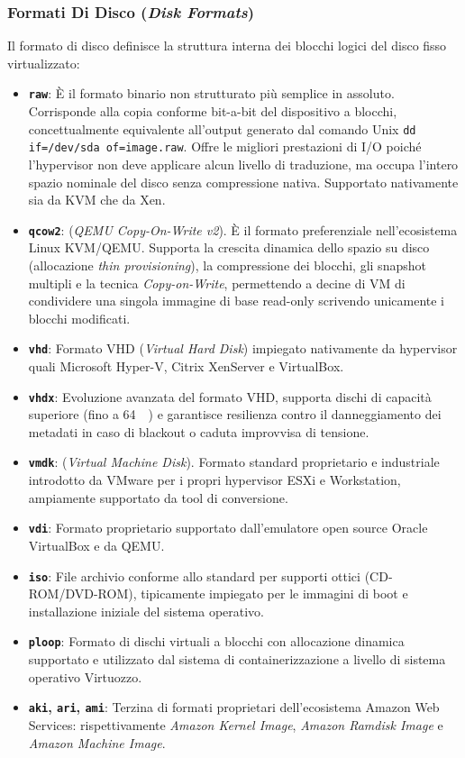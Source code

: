 \documentclass[11pt, a4paper]{article}
\begin{document}
\subsubsection{Formati Di Disco (\emph{Disk Formats})}
Il formato di disco definisce la struttura interna dei blocchi logici del disco fisso virtualizzato:
\begin{itemize}
    \item \textbf{\texttt{raw}}: È il formato binario non strutturato più semplice in assoluto. Corrisponde alla copia conforme bit-a-bit del dispositivo a blocchi, concettualmente equivalente all'output generato dal comando Unix \texttt{dd if=/dev/sda of=image.raw}. Offre le migliori prestazioni di I/O poiché l'hypervisor non deve applicare alcun livello di traduzione, ma occupa l'intero spazio nominale del disco senza compressione nativa. Supportato nativamente sia da KVM che da Xen.
    \item \textbf{\texttt{qcow2}}: (\emph{QEMU Copy-On-Write v2}). È il formato preferenziale nell'ecosistema Linux KVM/QEMU. Supporta la crescita dinamica dello spazio su disco (allocazione \emph{thin provisioning}), la compressione dei blocchi, gli snapshot multipli e la tecnica \emph{Copy-on-Write}, permettendo a decine di VM di condividere una singola immagine di base read-only scrivendo unicamente i blocchi modificati.
    \item \textbf{\texttt{vhd}}: Formato VHD (\emph{Virtual Hard Disk}) impiegato nativamente da hypervisor quali Microsoft Hyper-V, Citrix XenServer e VirtualBox.
    \item \textbf{\texttt{vhdx}}: Evoluzione avanzata del formato VHD, supporta dischi di capacità superiore (fino a \SI{64}{\tera\byte}) e garantisce resilienza contro il danneggiamento dei metadati in caso di blackout o caduta improvvisa di tensione.
    \item \textbf{\texttt{vmdk}}: (\emph{Virtual Machine Disk}). Formato standard proprietario e industriale introdotto da VMware per i propri hypervisor ESXi e Workstation, ampiamente supportato da tool di conversione.
    \item \textbf{\texttt{vdi}}: Formato proprietario supportato dall'emulatore open source Oracle VirtualBox e da QEMU.
    \item \textbf{\texttt{iso}}: File archivio conforme allo standard per supporti ottici (CD-ROM/DVD-ROM), tipicamente impiegato per le immagini di boot e installazione iniziale del sistema operativo.
    \item \textbf{\texttt{ploop}}: Formato di dischi virtuali a blocchi con allocazione dinamica supportato e utilizzato dal sistema di containerizzazione a livello di sistema operativo Virtuozzo.
    \item \textbf{\texttt{aki}, \texttt{ari}, \texttt{ami}}: Terzina di formati proprietari dell'ecosistema Amazon Web Services: rispettivamente \emph{Amazon Kernel Image}, \emph{Amazon Ramdisk Image} e \emph{Amazon Machine Image}.
\end{itemize}
\end{document}
